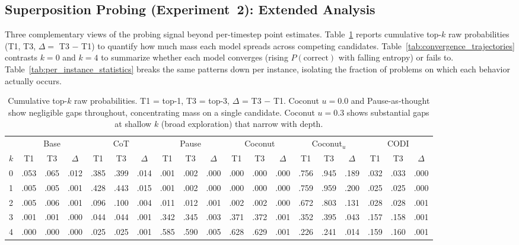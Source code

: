 \subsection{Superposition Probing (Experiment~2): Extended Analysis}
\label{app:superposition_extended}

Three complementary views of the probing signal beyond per-timestep point estimates. Table~\ref{tab:candidate_parallelism} reports cumulative top-$k$ raw probabilities (T1, T3, $\Delta = $ T3 $-$ T1) to quantify how much mass each model spreads across competing candidates. Table~\ref{tab:convergence_trajectories} contrasts $k{=}0$ and $k{=}4$ to summarize whether each model converges (rising $P(\text{correct})$ with falling entropy) or fails to. Table~\ref{tab:per_instance_statistics} breaks the same patterns down per instance, isolating the fraction of problems on which each behavior actually occurs.

\begin{table}[h!]
\centering
\small
\setlength{\tabcolsep}{4pt}
\caption{Cumulative top-$k$ raw probabilities. T1 = top-1, T3 = top-3, $\Delta$ = T3 $-$ T1. Coconut $u{=}0.0$ and Pause-as-thought show negligible gaps throughout, concentrating mass on a single candidate. Coconut $u{=}0.3$ shows substantial gaps at shallow $k$ (broad exploration) that narrow with depth.}
\begin{tabular}{l ccc ccc ccc ccc ccc ccc}
\toprule
 & \multicolumn{3}{c}{Base} & \multicolumn{3}{c}{CoT} & \multicolumn{3}{c}{Pause} & \multicolumn{3}{c}{Coconut} & \multicolumn{3}{c}{Coconut$_{u}$} & \multicolumn{3}{c}{CODI} \\
\cmidrule(lr){2-4} \cmidrule(lr){5-7} \cmidrule(lr){8-10} \cmidrule(lr){11-13} \cmidrule(lr){14-16} \cmidrule(lr){17-19}
$k$ & T1 & T3 & $\Delta$ & T1 & T3 & $\Delta$ & T1 & T3 & $\Delta$ & T1 & T3 & $\Delta$ & T1 & T3 & $\Delta$ & T1 & T3 & $\Delta$ \\
\midrule
0 & .053 & .065 & .012 & .385 & .399 & .014 & .001 & .002 & .000 & .000 & .000 & .000 & .756 & .945 & .189 & .032 & .033 & .000 \\
1 & .005 & .005 & .001 & .428 & .443 & .015 & .001 & .002 & .000 & .000 & .000 & .000 & .759 & .959 & .200 & .025 & .025 & .000 \\
2 & .005 & .006 & .001 & .096 & .100 & .004 & .011 & .012 & .001 & .002 & .002 & .000 & .672 & .803 & .131 & .028 & .028 & .001 \\
3 & .001 & .001 & .000 & .044 & .044 & .001 & .342 & .345 & .003 & .371 & .372 & .001 & .352 & .395 & .043 & .157 & .158 & .001 \\
4 & .000 & .000 & .000 & .025 & .025 & .001 & .585 & .590 & .005 & .628 & .629 & .001 & .226 & .241 & .014 & .159 & .160 & .001 \\
\bottomrule
\end{tabular}
\label{tab:candidate_parallelism}
\end{table}


